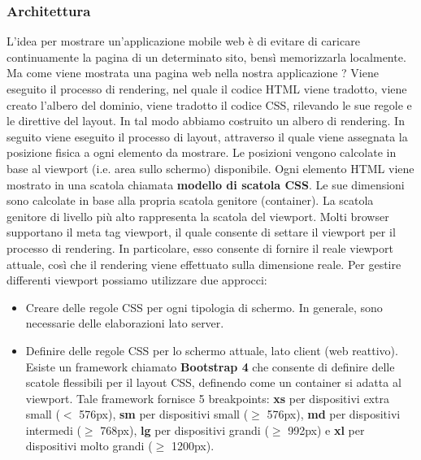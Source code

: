 \subsubsection{Architettura}
L'idea per mostrare un'applicazione mobile web è di evitare di caricare continuamente la pagina di un determinato sito, bensì memorizzarla localmente. Ma come viene mostrata una pagina web nella nostra applicazione ? Viene eseguito il processo di rendering, nel quale il codice HTML viene tradotto, viene creato l'albero del dominio, viene tradotto il codice CSS, rilevando le sue regole e le direttive del layout. In tal modo abbiamo costruito un albero di rendering. In seguito viene eseguito il processo di layout, attraverso il quale viene assegnata la posizione fisica a ogni elemento da mostrare. Le posizioni vengono calcolate in base al viewport (i.e. area sullo schermo) disponibile. Ogni elemento HTML viene mostrato in una scatola chiamata \textbf{modello di scatola CSS}. Le sue dimensioni sono calcolate in base alla propria scatola genitore (container). La scatola genitore di livello più alto rappresenta la scatola del viewport. Molti browser supportano il meta tag viewport, il quale consente di settare il viewport per il processo di rendering. In particolare, esso consente di fornire il reale viewport attuale, così che il rendering viene effettuato sulla dimensione reale. Per gestire differenti viewport possiamo utilizzare due approcci:
\begin{itemize}
\item Creare delle regole CSS per ogni tipologia di schermo. In generale, sono necessarie delle elaborazioni lato server.
\item Definire delle regole CSS per lo schermo attuale, lato client (web reattivo). Esiste un framework chiamato \textbf{Bootstrap 4} che consente di definire delle scatole flessibili per il layout CSS, definendo come un container si adatta al viewport. Tale framework fornisce 5 breakpoints: \textbf{xs} per dispositivi extra small ($<$ 576px), \textbf{sm} per dispositivi small ($\geq$ 576px), \textbf{md} per dispositivi intermedi ($\geq$ 768px), \textbf{lg} per dispositivi grandi ($\geq$ 992px) e \textbf{xl} per dispositivi molto grandi ($\geq$ 1200px).
\end{itemize}
